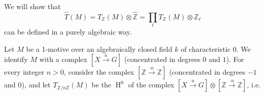     We will show that
    \[       \widehat {T}(M)       = T_\mathbb {Z}(M)\otimes \widehat {\mathbb {Z}}       = \prod _\ell  T_\mathbb {Z}(M)\otimes \mathbb {Z}_\ell      \]
    can be defined in a purely algebraic way.\par{}Let \(M\) be a 1-motive over an algebraically closed field \(k\) of characteristic \(0\).
    We identify \(M\) with a complex \([X\xrightarrow {u}G]\) (concentrated in degrees \(0\) and \(1\)).
    For every integer \(n>0\), consider the complex \([\mathbb {Z}\xrightarrow {\cdot  n}\mathbb {Z}]\) (concentrated in degrees \(-1\) and \(0\)), and let \(T_{\mathbb {Z}{/}n\mathbb {Z}}(M)\) be the \(\operatorname {H}^0\) of the complex \([X\xrightarrow {u}G]\otimes [\mathbb {Z}\xrightarrow {\cdot  n}\mathbb {Z}]\), i.e.
    
    

